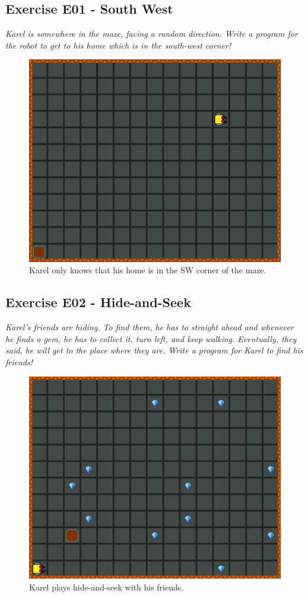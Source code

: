 \documentclass[article,A4,12pt]{llncs}
\begin{document}
{{{{\subsection{Exercise E01 - South West}

{\em Karel is somewhere in the maze, facing a random direction. Write a program for the robot to get 
to his home which is in the south-west corner!}\\[-7mm]


\begin{figure}[!ht]
\begin{center}
\includegraphics[height=0.4\textwidth]{img/e01.png}
\end{center}
\vspace{-4mm}
\caption{Karel only knows that his home is in the SW corner of the maze.}
\label{fig:e01}
\end{figure}
\noindent


\subsection{Exercise E02 - Hide-and-Seek}

{\em Karel's friends are hiding. To find them, he has to straight ahead 
and whenever he finds a gem, he has to collect it, 
turn left, and keep walking. Eventually, they said, he will get to the place 
where they are. Write a program for Karel to find his friends!}\\[-7mm]


\begin{figure}[!ht]
\begin{center}
\includegraphics[height=0.4\textwidth]{img/e02.png}
\end{center}
\vspace{-4mm}
\caption{Karel plays hide-and-seek with his friends.}
\label{fig:e02}
\vspace{-10mm}
\end{figure}
\noindent
\newpage

}}}}
\end{document}

